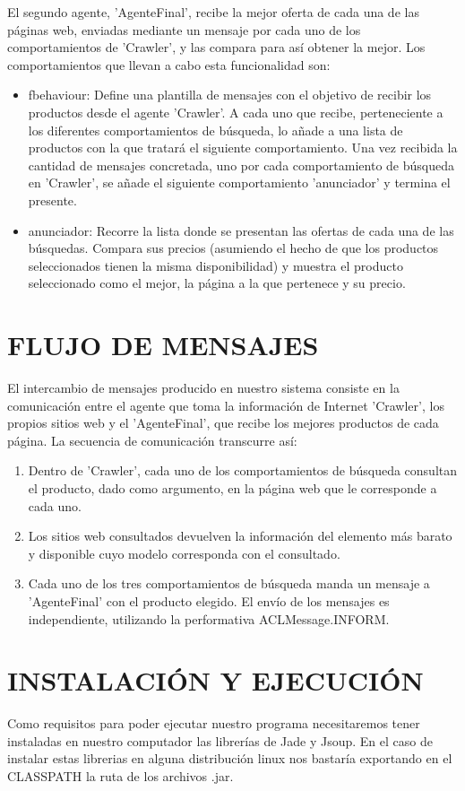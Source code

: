 \documentclass{pre-tfg}
\begin{document}
El segundo agente, 'AgenteFinal', recibe la mejor oferta de cada una de las páginas web, enviadas mediante un mensaje por cada uno de los comportamientos de 'Crawler', y las compara para así obtener la mejor. Los comportamientos que llevan a cabo esta funcionalidad son:
\begin{itemize}
 	\item fbehaviour: Define una plantilla de mensajes con el objetivo de recibir los productos desde el agente 'Crawler'. A cada uno que recibe, perteneciente a los diferentes comportamientos de búsqueda, lo añade a una lista de productos con la que tratará el siguiente comportamiento. Una vez recibida la cantidad de mensajes concretada, uno por cada comportamiento de búsqueda en 'Crawler', se añade el siguiente comportamiento 'anunciador' y termina el presente.
 	\item anunciador: Recorre la lista donde se presentan las ofertas de cada una de las búsquedas. Compara sus precios (asumiendo el hecho de que los productos seleccionados tienen la misma disponibilidad) y muestra el producto seleccionado como el mejor, la página a la que pertenece y su precio.
\end{itemize}

\section{FLUJO DE MENSAJES}
El intercambio de mensajes producido en nuestro sistema consiste en la comunicación entre el agente que toma la información de Internet 'Crawler', los propios sitios web y el 'AgenteFinal', que recibe los mejores productos de cada página. La secuencia de comunicación transcurre así:
\begin{enumerate}
	\item Dentro de 'Crawler', cada uno de los comportamientos de búsqueda consultan el producto, dado como argumento, en la página web que le corresponde a cada uno.
	\item Los sitios web consultados devuelven la información del elemento más barato y disponible cuyo modelo corresponda con el consultado.
	\item Cada uno de los tres comportamientos de búsqueda manda un mensaje a 'AgenteFinal' con el producto elegido. El envío de los mensajes es independiente, utilizando la performativa ACLMessage.INFORM.
\end{enumerate}

\section{INSTALACIÓN Y EJECUCIÓN}
Como requisitos para poder ejecutar nuestro programa necesitaremos tener instaladas en nuestro computador las librerías de Jade y Jsoup. En el caso de instalar estas librerias en alguna distribución linux nos bastaría exportando en el CLASSPATH la ruta de los archivos .jar.
\end{document}
